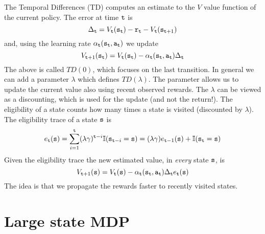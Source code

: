 The Temporal Differences (TD) computes an estimate to the $V$ value
function of the current policy. The error at time ${\tt t}$ is
\[
\Delta_{\tt t}=
V_{\tt t}({\tt s}_{\tt t})-{\tt r}_{\tt t}-V_{\tt t}({\tt s}_{{\tt t}+1})
\]
and, using the learning rate
$\alpha_{\tt t}({\tt s}_{\tt t},{\tt a}_{\tt t})$ we update
\[
V_{{\tt t}+1}({\tt s}_{\tt t})=V_{\tt t}({\tt s}_{\tt t})-\alpha_{\tt t}({\tt s}_{\tt t},{\tt a}_{\tt t})
\Delta_{\tt t}
\]
The above is called $TD(0)$, which focuses on the last transition.
In general we can add a parameter $\lambda$ which defines
$TD(\lambda)$. The parameter allows us to update the current value
also using recent observed rewards. The $\lambda$ can be viewed as a
discounting, which is used for the update (and not the return!). The
eligibility of a state counts how many times a state is visited
(discounted by $\lambda$). The eligibility trace of a state ${\tt s}$
is
\[
e_{\tt t}({\tt s})=\sum_{i=1}^{\tt t} (\lambda\gamma)^{{\tt t}-i}
\mathbb{I}({\tt s}_{{\tt t}-i}={\tt s}) =
(\lambda\gamma)e_{{\tt t}-1}({\tt s})+\mathbb{I}({\tt s}_{{\tt t}}={\tt s})
\]
Given the eligibility trace the new estimated value, in {\em every}
state ${\tt s}$, is
\[
V_{{\tt t}+1}({\tt s})=V_{\tt t}({\tt s})-\alpha_{\tt t}({\tt s}_{\tt t},{\tt a}_{\tt t})
\Delta_{\tt t} e_{\tt t}({\tt s})
\]
The idea is that we propagate the rewards faster to recently visited
states.




\section{Large state MDP}

